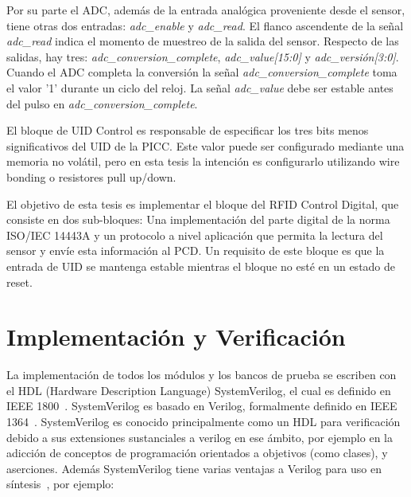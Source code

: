 \documentclass[a4paper, twoside, 11pt]{report}
\begin{document}
Por su parte el ADC, además de la entrada analógica proveniente desde el sensor, tiene otras dos entradas: \textit{adc\_enable} y \textit{adc\_read}. El flanco ascendente de la señal \textit{adc\_read} indica el momento de muestreo de la salida del sensor. Respecto de las salidas, hay tres: \textit{adc\_conversion\_complete}, \textit{adc\_value[15:0]} y \textit{adc\_versión[3:0]}. Cuando el ADC completa la conversión la señal \textit{adc\_conversion\_complete} toma el valor '1' durante un ciclo del reloj. La señal \textit{adc\_value} debe ser estable antes del pulso en \textit{adc\_conversion\_complete}.

El bloque de UID Control es responsable de especificar los tres bits menos significativos del UID de la PICC. Este valor puede ser configurado mediante una memoria no volátil, pero en esta tesis la intención es configurarlo utilizando wire bonding o resistores pull up/down.

El objetivo de esta tesis es implementar el bloque del RFID Control Digital, que consiste en dos sub-bloques: Una implementación del parte digital de la norma ISO/IEC 14443A y un protocolo a nivel aplicación que permita la lectura del sensor y envíe esta información al PCD. Un requisito de este bloque es que la entrada de UID se mantenga estable mientras el bloque no esté en un estado de reset.


\FloatBarrier
\chapter{Implementación y Verificación}

La implementación de todos los módulos y los bancos de prueba se escriben con el HDL (Hardware Description Language) SystemVerilog, el cual  es definido en IEEE 1800~\cite{ieee1800}. SystemVerilog es basado en Verilog,  formalmente definido en IEEE 1364~\cite{ieee1364}. SystemVerilog es conocido principalmente como un HDL para verificación debido a sus extensiones sustanciales a verilog en ese ámbito, por ejemplo en la adicción de conceptos de programación orientados a objetivos (como clases), y aserciones. Además SystemVerilog tiene varias ventajas a Verilog para uso en síntesis~\cite{synthesisable_sv}, por ejemplo:
\end{document}
